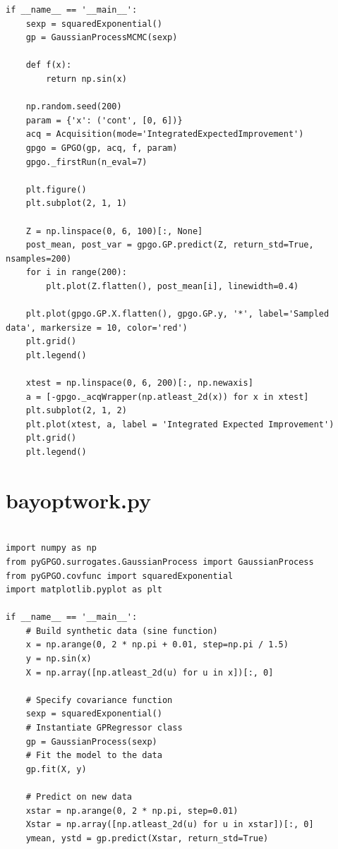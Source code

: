 \documentclass[10pt,a4paper,twoside]{book}
\begin{document}
\begin{appendices}
\begin{verbatim}
if __name__ == '__main__':
    sexp = squaredExponential()
    gp = GaussianProcessMCMC(sexp)

    def f(x):
        return np.sin(x)

    np.random.seed(200)
    param = {'x': ('cont', [0, 6])}
    acq = Acquisition(mode='IntegratedExpectedImprovement')
    gpgo = GPGO(gp, acq, f, param)
    gpgo._firstRun(n_eval=7)

    plt.figure()
    plt.subplot(2, 1, 1)

    Z = np.linspace(0, 6, 100)[:, None]
    post_mean, post_var = gpgo.GP.predict(Z, return_std=True, nsamples=200)
    for i in range(200):
        plt.plot(Z.flatten(), post_mean[i], linewidth=0.4)

    plt.plot(gpgo.GP.X.flatten(), gpgo.GP.y, '*', label='Sampled data', markersize = 10, color='red')
    plt.grid()
    plt.legend()

    xtest = np.linspace(0, 6, 200)[:, np.newaxis]
    a = [-gpgo._acqWrapper(np.atleast_2d(x)) for x in xtest]
    plt.subplot(2, 1, 2)
    plt.plot(xtest, a, label = 'Integrated Expected Improvement')
    plt.grid()
    plt.legend()               
\end{verbatim}


\section{bayoptwork.py}
\label{bayoptwork}

\begin{verbatim}

import numpy as np
from pyGPGO.surrogates.GaussianProcess import GaussianProcess
from pyGPGO.covfunc import squaredExponential
import matplotlib.pyplot as plt

if __name__ == '__main__':
    # Build synthetic data (sine function)
    x = np.arange(0, 2 * np.pi + 0.01, step=np.pi / 1.5)
    y = np.sin(x)
    X = np.array([np.atleast_2d(u) for u in x])[:, 0]

    # Specify covariance function
    sexp = squaredExponential()
    # Instantiate GPRegressor class
    gp = GaussianProcess(sexp)
    # Fit the model to the data
    gp.fit(X, y)

    # Predict on new data
    xstar = np.arange(0, 2 * np.pi, step=0.01)
    Xstar = np.array([np.atleast_2d(u) for u in xstar])[:, 0]
    ymean, ystd = gp.predict(Xstar, return_std=True)


\end{verbatim}
\end{appendices}
\end{document}
